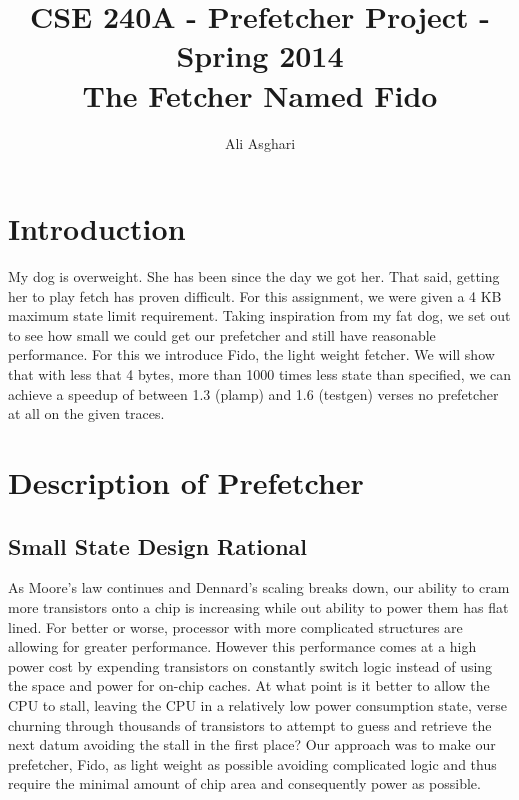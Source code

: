 \documentclass[11pt]{article}
\begin{document}
\title{CSE 240A - Prefetcher Project - Spring 2014 \\  \large The Fetcher Named Fido}

\author{Ali Asghari}
\date{}
\maketitle

\section{Introduction}
My dog is overweight. She has been since the day we got her.  That said, getting her to play fetch has proven difficult. For this assignment, we were given a 4 KB maximum state limit requirement. Taking inspiration from my fat dog, we set out to see how small we could get our prefetcher and still have reasonable performance. For this we introduce Fido, the light weight fetcher. We will show that with less that 4 bytes, more than 1000 times less state than specified, we can achieve a speedup of between 1.3 (plamp) and 1.6 (testgen) verses no prefetcher at all on the given traces.    
  
\section{Description of Prefetcher}
\subsection{Small State Design Rational}
As Moore's law continues and Dennard's scaling breaks down, our ability to cram more transistors onto a chip is increasing while out ability to power them has flat lined. For better or worse, processor with more complicated structures are allowing for greater performance. However this performance comes at a high power cost by expending transistors on constantly switch logic instead of using the space and power for on-chip caches. At what point is it better to allow the CPU to stall, leaving the CPU in a relatively low power consumption state, verse churning through thousands of transistors to attempt to guess and retrieve the next datum avoiding the stall in the first place? Our approach was to make our prefetcher, Fido, as light weight as possible avoiding complicated logic and thus require the minimal amount of chip area and consequently power as possible.
\end{document}
